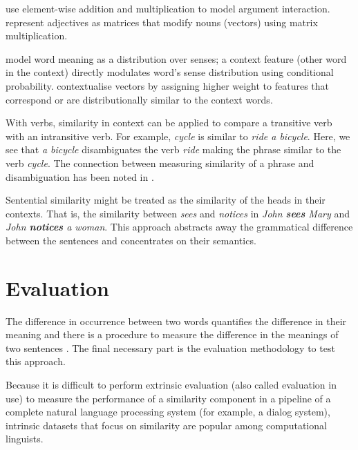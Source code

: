  use element-wise addition and multiplication to model argument interaction.  represent adjectives as matrices that modify nouns (vectors) using matrix multiplication.

 model word meaning as a distribution over senses; a context feature (other word in the context)  directly modulates word’s sense distribution using conditional probability.  contextualise vectors by assigning higher weight to features that correspond or are distributionally similar to the context words.


With verbs, similarity in context can be applied to compare a transitive verb with an intransitive verb. For example, \textit{cycle} is similar to \textit{ride a bicycle}. Here, we see that \textit{a bicycle} disambiguates the verb \textit{ride} making the phrase similar to the verb \textit{cycle}. The connection between measuring similarity of a phrase and disambiguation has been noted in .


Sentential similarity might be treated as the similarity of the heads in their contexts. That is, the similarity between \textit{sees} and \textit{notices} in \textit{John \textbf{sees} Mary} and \textit{John \textbf{notices} a woman}. This approach abstracts away the grammatical difference between the sentences and concentrates on their semantics.


\section{Evaluation}
\label{sec:intrinsic-evaluation}

The difference in occurrence between two words quantifies the difference in their meaning \cite{harris1954distributional} and there is a procedure to measure the difference in the meanings of two sentences \cite{DBLP:journals/corr/abs-1003-4394}. The final necessary part is the evaluation methodology to test this approach.

Because it is difficult to perform extrinsic evaluation (also called evaluation in use) to measure the performance of a similarity component in a pipeline of a complete natural language processing system (for example, a dialog system), intrinsic datasets that focus on similarity are popular among computational linguists.

